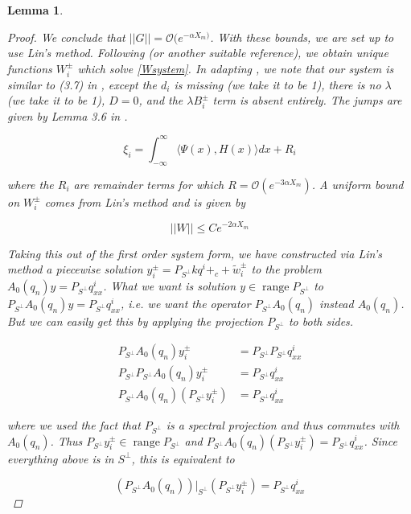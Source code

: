 \documentclass[12pt]{article}
\DeclareMathOperator{\ran}{range}
\newtheorem{lemma}{Lemma}
\begin{document}
\begin{lemma}
\begin{proof}
We conclude that $||G|| = \mathcal{O}(e^{-\alpha X_m)}$. With these bounds, we are set up to use Lin's method. Following \cite{Sandstede1998} (or another suitable reference), we obtain unique functions $W_i^\pm$ which solve \eqref{Wsystem}. In adapting \cite{Sandstede1998}, we note that our system is similar to (3.7) in \cite{Sandstede1998}, except the $d_i$ is missing (we take it to be 1), there is no $\lambda$ (we take it to be 1), $D = 0$, and the $\lambda B_i^\pm$ term is absent entirely. The jumps are given by Lemma 3.6 in \cite{Sandstede1998}.

\begin{equation}
\xi_i = \int_{-\infty}^\infty \langle \Psi(x), H(x) \rangle dx + R_i
\end{equation}

where the $R_i$ are remainder terms for which $R = \mathcal{O}(e^{-3 \alpha X_m})$. A uniform bound on $W_i^\pm$ comes from Lin's method and is given by 

\begin{equation}\label{Wbound}
||W|| \leq C e^{-2 \alpha X_m}
\end{equation}

Taking this out of the first order system form, we have constructed via Lin's method a piecewise solution $y_i^\pm = P_{S^\perp} k q^i+_c + \tilde{w}_i^\pm$ to the problem $A_0(q_n) y = P_{S^\perp} q^i_{xx}$. What we want is solution $y \in \ran P_{S^\perp}$ to $P_{S^\perp} A_0(q_n) y = P_{S^\perp} q^i_{xx}$, i.e. we want the operator $P_{S^\perp} A_0(q_n)$ instead $A_0(q_n)$. But we can easily get this by applying the projection $P_{S^\perp}$ to both sides.

\begin{align*}
P_{S^\perp} A_0(q_n) y_i^\pm &= P_{S^\perp} P_{S^\perp} q^i_{xx} \\
P_{S^\perp} P_{S^\perp} A_0(q_n) y_i^\pm &= P_{S^\perp} q^i_{xx} \\
P_{S^\perp} A_0(q_n) (P_{S^\perp} y_i^\pm) &= P_{S^\perp} q^i_{xx}
\end{align*}

where we used the fact that $P_{S^\perp}$ is a spectral projection and thus commutes with $A_0(q_n)$. Thus $P_{S^\perp} y_i^\pm \in \ran P_{S^\perp}$ and $P_{S^\perp} A_0(q_n) (P_{S^\perp} y_i^\pm) = P_{S^\perp} q^i_{xx}$. Since everything above is in $S^\perp$, this is equivalent to

\begin{equation}
(P_{S^\perp} A_0(q_n))|_{S^\perp} (P_{S^\perp} y_i^\pm) = P_{S^\perp} q^i_{xx}
\end{equation}


\end{proof}
\end{lemma}
\end{document}
